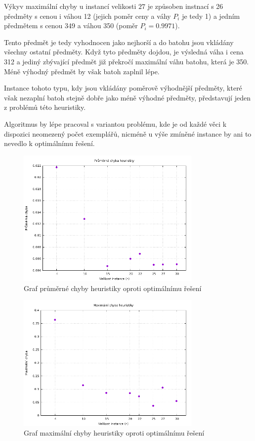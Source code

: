 \documentclass[11pt]{article}
\begin{document}
Výkyv maximální chyby u instancí velikosti $27$ je způsoben instnací s 26 předměty s cenou i váhou 12 (jejich poměr ceny a váhy $P_i$ je tedy 1) a jedním předmětem s cenou 349 a váhou 350 (poměr $P_i = 0.9971$).

Tento předmět je tedy vyhodnocen jako nejhorší a do batohu jsou vkládány všechny ostatní předměty. Když tyto předměty dojdou, je výsledná váha i cena 312 a jediný zbývající předmět již překročí maximální váhu batohu, která je 350. Méně výhodný předmět by však batoh zaplnil lépe.

Instance tohoto typu, kdy jsou vkládány poměrově výhodnější předměty, které však nezaplní batoh stejně dobře jako méně výhodné předměty, před\-stavují jeden z problémů této heuristiky. 

Algoritmus by lépe pracoval s variantou problému, kde je od každé věci k dispozici neomezený počet exemplářů, nicméně u výše zmíněné instance by ani to nevedlo k optimálnímu řešení.

\begin{figure}[h!]
	\centering
    	\includegraphics[width=0.8\textwidth]{avg_error.png}
    	\caption{Graf průměrné chyby heuristiky oproti optimálnímu řešení}
	\label{fig:avg_error}
\end{figure}

\begin{figure}[h!]
	\centering
    	\includegraphics[width=0.8\textwidth]{max_error.png}
    	\caption{Graf maximální chyby heuristiky oproti optimálnímu řešení}
	\label{fig:max_error}
\end{figure}
\end{document}
